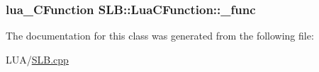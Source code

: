 \subsubsection[{\texorpdfstring{\+\_\+func}{_func}}]{\setlength{\rightskip}{0pt plus 5cm}lua\+\_\+\+C\+Function S\+L\+B\+::\+Lua\+C\+Function\+::\+\_\+func\hspace{0.3cm}{\ttfamily [protected]}}\hypertarget{classSLB_1_1LuaCFunction_ae19c24c4711753f003948fa27011b9eb}{}\label{classSLB_1_1LuaCFunction_ae19c24c4711753f003948fa27011b9eb}


The documentation for this class was generated from the following file\+:\begin{DoxyCompactItemize}
\item 
L\+U\+A/\hyperlink{SLB_8cpp}{S\+L\+B.\+cpp}\end{DoxyCompactItemize}
